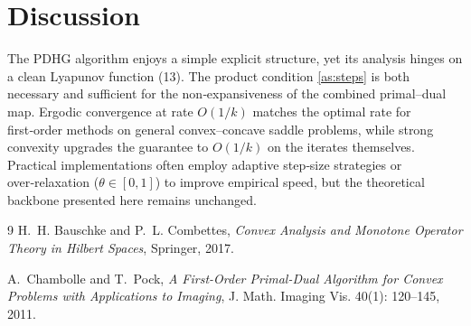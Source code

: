 \documentclass{article}
\begin{document}
\section*{Discussion}
The PDHG algorithm enjoys a simple explicit structure, yet its analysis hinges on a clean Lyapunov function (13).  
The product condition \eqref{as:steps} is both necessary and sufficient for the non‑expansiveness of the combined primal–dual map.  
Ergodic convergence at rate $O(1/k)$ matches the optimal rate for first‑order methods on general convex–concave saddle problems, while strong convexity upgrades the guarantee to $O(1/k)$ on the iterates themselves.  
Practical implementations often employ adaptive step‑size strategies or over‑relaxation ($\theta\in[0,1]$) to improve empirical speed, but the theoretical backbone presented here remains unchanged.

\begin{thebibliography}{9}
H.~H. Bauschke and P.~L. Combettes, \emph{Convex Analysis and Monotone Operator Theory in Hilbert Spaces}, Springer, 2017.

A.~Chambolle and T.~Pock, \emph{A First-Order Primal-Dual Algorithm for Convex Problems with Applications to Imaging}, J. Math. Imaging Vis. 40(1): 120–145, 2011.
\end{thebibliography}
\end{document}
